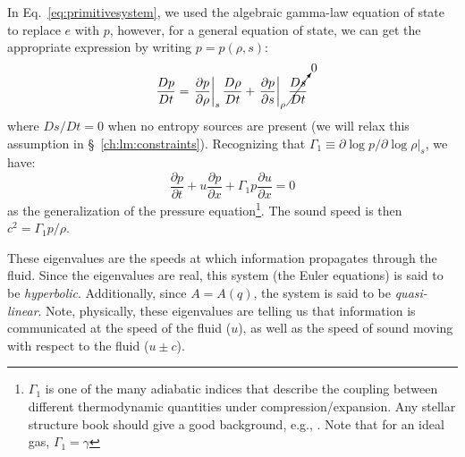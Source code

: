 In Eq.~\ref{eq:primitivesystem}, we used the algebraic gamma-law
equation of state to replace $e$ with $p$, however, for a general
equation of state, we can get the appropriate expression by writing $p
= p(\rho, s)$:
\begin{equation}
\frac{Dp}{Dt} = \left . \frac{\partial p}{\partial \rho} \right |_s
     \frac{D\rho}{Dt} +
     \left . \frac{\partial p}{\partial s} \right |_\rho
     \cancelto{0}{\frac{Ds}{Dt}}
\end{equation}
where $Ds/Dt = 0$ when no entropy sources are present (we will relax this
assumption in \S~\ref{ch:lm:constraints}).  Recognizing
that $\Gamma_1 \equiv \partial \log p/\partial \log \rho |_s$, we have:
\begin{equation}
\frac{\partial p}{\partial t} + u \frac{\partial p}{\partial x}
  + \Gamma_1 p \frac{\partial u}{\partial x} = 0  \label{eq:euler:pgeneral}
\end{equation}
as the generalization of the pressure equation\footnote{$\Gamma_1$ is one of the
many adiabatic indices that describe the coupling between different
thermodynamic quantities under compression/expansion.  Any stellar structure
book should give a good background, e.g., \cite{HKT}.  Note that for an ideal gas, $\Gamma_1 = \gamma$}.
The sound speed is then $c^2 = \Gamma_1 p /\rho$.

These eigenvalues are the speeds at which information propagates
through the fluid.  Since the eigenvalues are real, this system (the
Euler equations) is said to be {\em hyperbolic}.  Additionally, since
$A = A(q)$, the system is said to be {\em quasi-linear}.  Note,
physically, these eigenvalues are telling us that information is
communicated at the speed of the fluid ($u$), as well as the speed of
sound moving with respect to the fluid ($u \pm c$).

